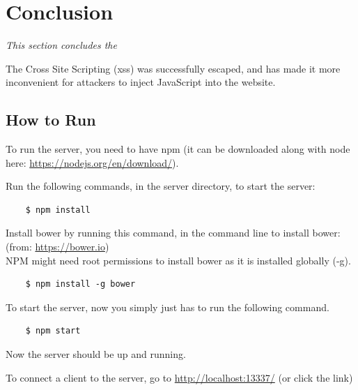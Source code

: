 \documentclass[a4paper]{article}
\begin{document}


\section{Conclusion}
\textit{This section concludes the }

The Cross Site Scripting (xss) was successfully escaped, and has made it more inconvenient for attackers to inject JavaScript into the website.

\label{page_b4_appendices}




\clearpage
\rfoot{ }



\listoffigures
\listoflistings




\begin{appendices}
\section{How to Run}
\label{app_h2r}
To run the server, you need to have npm (it can be downloaded along with
  node here: \url{https://nodejs.org/en/download/}).

Run the following commands, in the server directory, to start the server:
\begin{verbatim}
	$ npm install
\end{verbatim}
  
Install bower by running this command, in the command line to install
bower: (from: \url{https://bower.io})\\
NPM might need root permissions to install bower as it is installed globally (-g).

\begin{verbatim}
	$ npm install -g bower
\end{verbatim}

To start the server, now you simply just has to run the following command.

\begin{verbatim}
	$ npm start
\end{verbatim}

Now the server should be up and running.

To connect a client to the server, go to \url{http://localhost:13337/} (or click the link)
\end{appendices}
\end{document}
